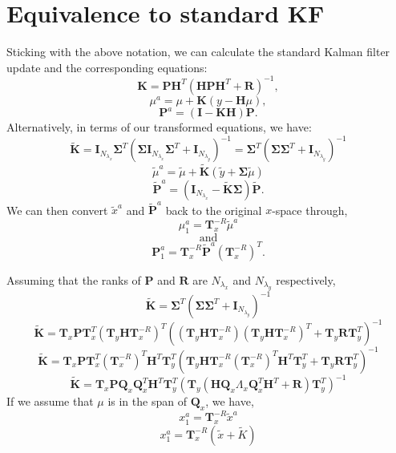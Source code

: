 \documentclass[11pt]{article} %
\newcommand{\mat}{\mathbf}
\begin{document}
\section{Equivalence to standard KF}

Sticking with the above notation, we can calculate the standard Kalman
filter update and the corresponding equations:
\[
  \mat{K} = \mat{P}\mat{H}^T (\mat{H} \mat{P} \mat{H}^T + \mat{R})^{-1},
\]
\[
  \mu^a = \mu + \mat{K} (y - \mat{H} \mu),
\]
\[
  \mat{P}^a = (\mat{I} - \mat{K} \mat{H}) \mat{P}.
\]
Alternatively, in terms of our transformed equations, we have:
\[
  \tilde{\mat{K}} = \mat{I}_{N_{\lambda_x}} \mat{\Sigma}^T ( \mat{\Sigma} \mat{I}_{N_{\lambda_x}}
  \mat{\Sigma}^T + \mat{I}_{N_{\lambda_y}})^{-1} = \mat{\Sigma}^T (\mat{\Sigma}
  \mat{\Sigma}^T + \mat{I}_{N_{\lambda_y}})^{-1}
\]
\[
  \tilde{\mu}^a = \tilde{\mu} + \tilde{\mat{K}}(\tilde{y} + \mat{\Sigma} \tilde{\mu})
\]
\[
  \tilde{\mat{P}}^a = (\mat{I}_{N_{\lambda_x}} - \tilde{\mat{K}} \mat{\Sigma}) \tilde{\mat{P}}.
\]
We can then convert $\tilde{x}^a$ and $\tilde{\mat{P}}^a$ back to the
original $x$-space through,
\[
  \mu^a_1 = \mat{T}_x^{-R} \tilde{\mu}^a
\]
\[
  \text{ and }
\]
\[
  \mat{P}^a_1 = \mat{T}_x^{-R} \tilde{\mat{P}}^a \left(\mat{T}_x^{-R}\right)^T.
\]

Assuming that the ranks of $\mat{P}$ and $\mat{R}$ are $N_{\lambda_x}$
and $N_{\lambda_y}$ respectively,
\[
  \tilde{\mat{K}} = \mat{\Sigma}^T (\mat{\Sigma} \mat{\Sigma}^T +
  \mat{I}_{N_{\lambda_y}})^{-1}
\]
\[
  \tilde{\mat{K}} = \mat{T}_x \mat{P} \mat{T}_x^T (\mat{T}_y \mat{H}
  \mat{T}_x^{-R})^T \left((\mat{T}_y \mat{H} \mat{T}_x^{-R})(\mat{T}_y
  \mat{H} \mat{T}_x^{-R})^T + \mat{T}_y \mat{R} \mat{T}_y^T \right)^{-1}
\]
\[
  \tilde{\mat{K}} = \mat{T}_x \mat{P} \mat{T}_x^T \left( \mat{T}_x^{-R}
  \right)^T \mat{H}^T \mat{T}_y^T
  \left( \mat{T}_y \mat{H} \mat{T}_x^{-R} \left( \mat{T}_x^{-R}
    \right)^T \mat{H}^T \mat{T}_y^T + \mat{T}_y \mat{R} \mat{T}_y^T \right)^{-1}
\]
\[
  \tilde{\mat{K}} = \mat{T}_x \mat{P} \mat{Q}_x \mat{Q}_x^T \mat{H}^T \mat{T}_y^T
  \left( \mat{T}_y \left( \mat{H} \mat{Q}_x \Lambda_x \mat{Q}_x^T
      \mat{H}^T + \mat{R}\right) \mat{T}_y^T \right)^{-1}
\]
If we assume that $\mu$ is in the span of $\mat{Q}_x$, we have,
\[
   x^a_1 = \mat{T}_x^{-R} \tilde{x}^a
\]
\[
   x^a_1 = \mat{T}_x^{-R} \left( \tilde{x} + \tilde{K} \right)
\]


\end{document}
